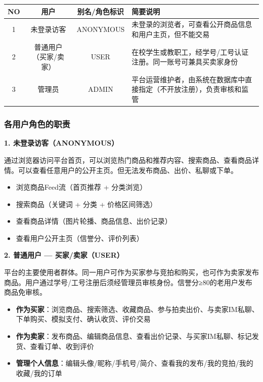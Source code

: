 \documentclass[12pt,a4paper]{ctexart}
\numberwithin{figure}{section}
\numberwithin{table}{section}
\begin{document}
\begin{center}
\renewcommand{\arraystretch}{1.3}
\begin{tabular}{|c|c|c|p{6cm}|}
\hline
\rowcolor{tableheader}
\textbf{NO} & \textbf{用户} & \textbf{别名/角色标识} & \textbf{简要说明} \\
\hline
1 & 未登录访客 & ANONYMOUS & 未登录的浏览者，可查看公开商品信息和用户主页，但不能交易 \\
\hline
2 & 普通用户（买家/卖家） & USER & 在校学生或教职工，经学号/工号认证注册。同一账号可兼具买卖家身份 \\
\hline
3 & 管理员 & ADMIN & 平台运营维护者，由系统在数据库中直接指定（不开放注册），负责审核和监管 \\
\hline
\end{tabular}
\end{center}

\subsubsection{各用户角色的职责}

\textbf{1. 未登录访客（ANONYMOUS）}

通过浏览器访问平台首页，可以浏览热门商品和推荐内容、搜索商品、查看商品详情。可以查看任意用户的公开主页。但无法发布商品、出价、私聊或下单。

\begin{itemize}
    \item 浏览商品Feed流（首页推荐 + 分类浏览）
    \item 搜索商品（关键词 + 分类 + 价格区间筛选）
    \item 查看商品详情（图片轮播、商品信息、出价记录）
    \item 查看用户公开主页（信誉分、评价列表）
\end{itemize}

\textbf{2. 普通用户 --- 买家/卖家（USER）}

平台的主要使用者群体。同一用户可作为买家参与竞拍和购买，也可作为卖家发布商品。用户通过学号/工号注册后须经管理员审核身份。信誉分≥80的老用户发布商品免审核。

\begin{itemize}
    \item \textbf{作为买家}：浏览商品、搜索筛选、收藏商品、参与拍卖出价、与卖家IM私聊、下单购买、模拟支付、确认收货、评价交易
    \item \textbf{作为卖家}：发布商品、编辑商品信息、查看出价记录、与买家IM私聊、标记发货、查看订单、收到评价
    \item \textbf{管理个人信息}：编辑头像/昵称/手机号/简介、查看我的发布/我的竞拍/我的收藏/我的订单
\end{itemize}
\end{document}
